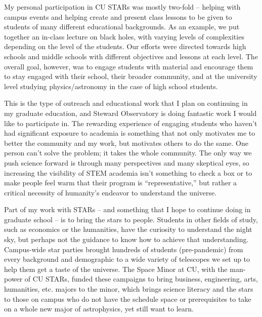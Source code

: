 \documentclass[11pt,letterpaper]{article}
\begin{document}
My personal participation in CU STARs was mostly two-fold -- helping with campus events and helping create and present class lessons to be given to students of many different educational backgrounds. As an example, we put together an in-class lecture on black holes, with varying levels of complexities depending on the level of the students. Our efforts were directed towards high schools and middle schools with different objectives and lessons at each level. The overall goal, however, was to engage students with material and encourage them to stay engaged with their school, their broader community, and at the university level studying physics/astronomy in the case of high school students.

This is the type of outreach and educational work that I plan on continuing in my graduate education, and  Steward Observatory is doing fantastic work I would like to participate in. The rewarding experience of engaging students who haven’t had significant exposure to academia is something that not only motivates me to better the community and my work, but motivates others to do the same. One person can't solve the problem; it takes the whole community. The only way we push science forward is through many perspectives and many skeptical eyes, so increasing the visibility of STEM academia isn’t something to check a box or to make people feel warm that their program is “representative,” but rather a critical necessity of humanity’s endeavor to understand the universe. 

\pagebreak

Part of my work with STARs -- and something that I hope to continue doing in graduate school -- is to bring the stars to people. Students in other fields of study, such as economics or the humanities, have the curiosity to understand the night sky, but perhaps not the guidance to know how to achieve that understanding. Campus-wide star parties brought hundreds of students (pre-pandemic) from every background and demographic to a wide variety of telescopes we set up to help them get a taste of the universe. The Space Minor at CU, with the man-power of CU STARs, funded these campaigns to bring business, engineering, arts, humanities, etc. majors to the minor, which brings science literacy and the stars to those on campus who do not have the schedule space or prerequisites to take on a whole new major of astrophysics, yet still want to learn.
\end{document}

